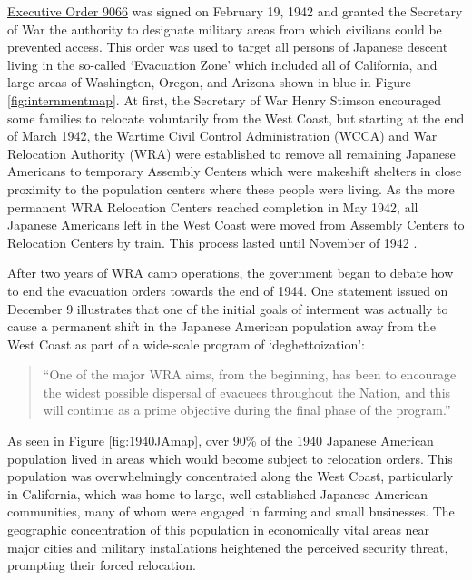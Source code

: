 \href{https://www.archives.gov/milestone-documents/executive-order-9066}{Executive Order 9066} 
was signed on February 19, 1942 and granted the Secretary of War the authority
to designate military areas from which civilians could be prevented access. This
order was used to target all persons of Japanese descent living in the so-called
`Evacuation Zone' which included all of California, and large areas of
Washington, Oregon, and Arizona shown in blue in Figure \ref{fig:internmentmap}.
At first, the Secretary of War Henry Stimson encouraged some families to relocate voluntarily from the West Coast,
but starting at the end of March 1942, 
the Wartime Civil Control Administration (WCCA) and War Relocation Authority (WRA)
were established to remove all remaining Japanese Americans to temporary
Assembly Centers which were makeshift shelters in close proximity to the
population centers where these people were living. As the more permanent WRA
Relocation Centers reached completion in May 1942, all Japanese Americans left
in the West Coast were moved from Assembly Centers to Relocation Centers by
train. This process lasted until November of 1942
\citep{commissiononwartimerelocationPersonalJusticeDenied1983}.

After two years of WRA camp operations, the government began to debate how to
end the evacuation orders towards the end of 1944. One statement issued on
December 9 illustrates that one of the initial goals of interment was actually
to cause a permanent shift in the Japanese American population away from the
West Coast as part of a wide-scale program of `deghettoization':
\begin{quote}
  ``One of the major WRA aims, from the beginning, has been to encourage the widest possible dispersal of evacuees throughout the Nation, and this will continue as a prime objective during the final phase of the program.''
  \hfill \cite[p.~234]{commissiononwartimerelocationPersonalJusticeDenied1983}
\end{quote}

As seen in Figure \ref{fig:1940JAmap}, over 90\% of the 1940 Japanese American
population lived in areas which would become subject to relocation orders.
This population was overwhelmingly concentrated along the West Coast, particularly in California,
which was home to large, well-established Japanese American communities,
many of whom were engaged in farming and small businesses.
The geographic concentration of this population in economically vital areas near major cities and military installations heightened the perceived security threat,
prompting their forced relocation.
